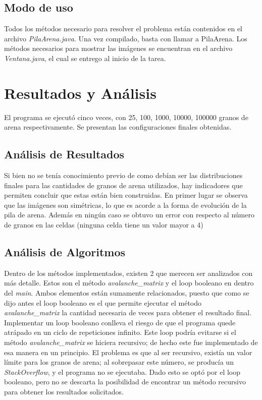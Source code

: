 \documentclass[letterpaper,11pt]{article} %
\begin{document}
\subsection{Modo de uso}
Todos los métodos necesario para resolver el problema están contenidos en el archivo \textit{PilaArena.java}. Una vez compilado, basta con llamar a PilaArena.
\newp
Los métodos necesarios para mostrar las imágenes se encuentran en el archivo \textit{Ventana.java}, el cual se entrego al inicio de la tarea. 

\section{Resultados y Análisis}
El programa se ejecutó cinco veces, con 25, 100, 1000, 10000, 100000 granos de arena respectivamente. Se presentan las configuraciones finales obtenidas.


\subsection{Análisis de Resultados}
Si bien no se tenía conocimiento previo de como debían ser las distribuciones finales para las cantidades de granos de arena utilizados, hay indicadores que permiten concluir que estas están bien construidas. En primer lugar se observa que las imágenes son simétricas, lo que es acorde a la forma de evolución de la pila de arena. Además en ningún caso se obtuvo un error con respecto al número de granos en las celdas (ninguna celda tiene un valor mayor a 4)

\subsection{Análisis de Algoritmos}
Dentro de los métodos implementados, existen 2 que merecen ser analizados con más detalle. Estos son el método \textit{avalanche\_matrix} y el loop booleano en dentro del \textit{main}. 
\newp
Ambos elementos están sumamente relacionados, puesto que como se dijo antes el loop booleano es el que permite ejecutar el método \textit{avalanche\_matrix} la cantidad necesaria de veces para obtener el resultado final. Implementar un loop booleano conlleva el riesgo de que el programa quede atrápado en un ciclo de repeticiones infinito. Este loop podría evitarse si el método \textit{avalanche\_matrix} se hiciera recursivo; de hecho este fue implementado de esa manera en un principio. El problema es que al ser recursivo, existía un valor límite para los granos de arena; al sobrepasar este número, se producía un \textit{StackOverflow}, y el programa no se ejecutaba. Dado esto se optó por el loop booleano, pero no se descarta la posibilidad de encontrar un método recursivo para obtener los resultados solicitados.
\end{document}
